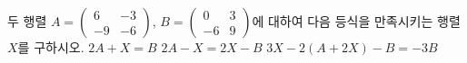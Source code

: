 두 행렬 $A=\begin{pmatrix} 6 & -3 \\ -9 & -6 \end{pmatrix}$, $B=\begin{pmatrix} 0 & 3 \\ -6 & 9 \end{pmatrix}$에 대하여 다음 등식을 만족시키는 행렬 $X$를 구하시오.
 $2A+X=B$
 $2A-X=2X-B$
 $3X-2(A+2X)-B=-3B$

